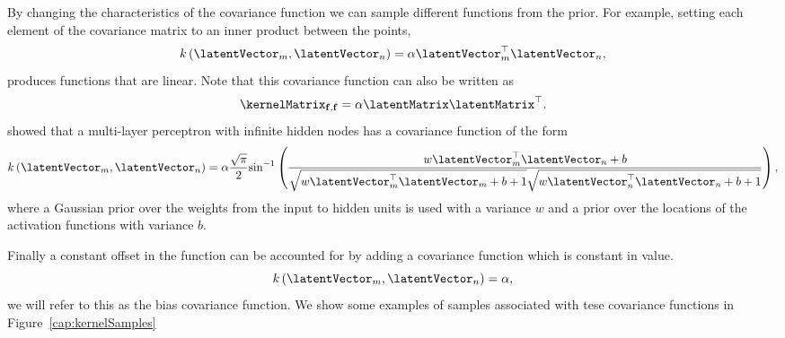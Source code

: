 
By changing the characteristics of the covariance function we can
sample different functions from the prior. For example, setting each
element of the covariance matrix to an inner product between the points,
\[
k\left(\latentVector_{m},\latentVector_{n}\right)=\alpha\latentVector_{m}^{\top}\latentVector_{n},
\]
produces functions that are linear. Note that this covariance function
can also be written as
\[
\kernelMatrix_{\mathbf{f},\mathbf{f}}=\alpha \latentMatrix\latentMatrix^{\top}.
\]
 \citet{Williams:infinite96} showed that a multi-layer perceptron
with infinite hidden nodes has a covariance function of the form
\[
k\left(\latentVector_{m},\latentVector_{n}\right)=\alpha\frac{\sqrt{\pi}}{2}\textrm{sin}^{-1}\left(\frac{w\latentVector_{m}^{\top}\latentVector_{n}+b}{\sqrt{w\latentVector_{m}^{\top}\latentVector_{m}+b+1}\sqrt{w\latentVector_{n}^{\top}\latentVector_{n}+b+1}}\right),
\]
where a Gaussian prior over the weights from the input to hidden units
is used with a variance $w$ and a prior over the locations of the
activation functions with variance $b$. 

Finally a constant offset in the function can be accounted for by
adding a covariance function which is constant in value. 
\[
k\left(\latentVector_{m},\latentVector_{n}\right)=\alpha,
\]
we will refer to this as the bias covariance function.  We show
some examples of samples associated with tese covariance functions in
Figure~\ref{cap:kernelSamples}

